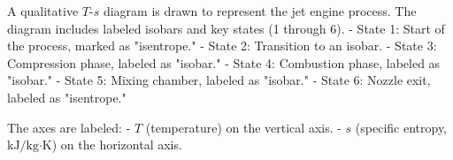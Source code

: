 A qualitative \( T \)-\( s \) diagram is drawn to represent the jet engine process. The diagram includes labeled isobars and key states (1 through 6).  
- State 1: Start of the process, marked as "isentrope."  
- State 2: Transition to an isobar.  
- State 3: Compression phase, labeled as "isobar."  
- State 4: Combustion phase, labeled as "isobar."  
- State 5: Mixing chamber, labeled as "isobar."  
- State 6: Nozzle exit, labeled as "isentrope."  

The axes are labeled:  
- \( T \) (temperature) on the vertical axis.  
- \( s \) (specific entropy, \( \text{kJ/kg·K} \)) on the horizontal axis.